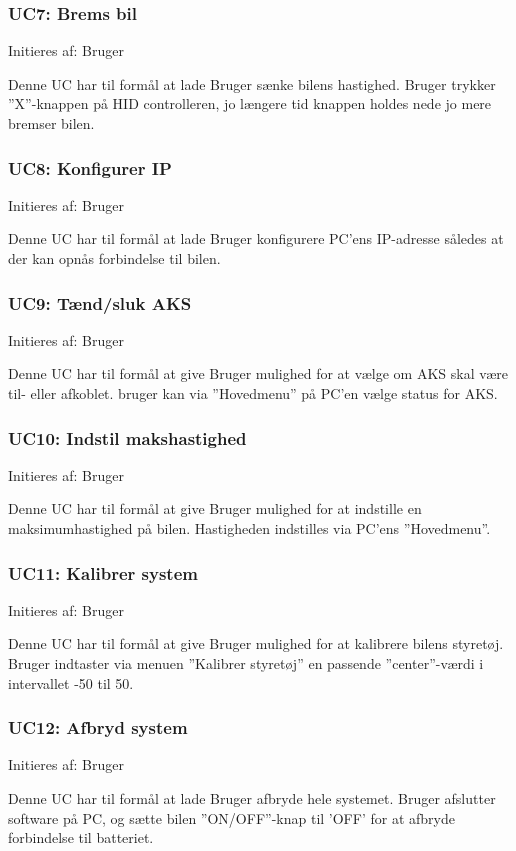\subsubsection{UC7: Brems bil}
Initieres af: Bruger

Denne UC har til formål at lade Bruger sænke bilens hastighed. Bruger trykker ''X''-knappen på HID controlleren, jo længere tid knappen holdes nede jo mere bremser bilen. 

\subsubsection{UC8: Konfigurer IP}
Initieres af: Bruger

Denne UC har til formål at lade Bruger konfigurere PC'ens IP-adresse således at der kan opnås forbindelse til bilen.  

\subsubsection{UC9: Tænd/sluk AKS}
Initieres af: Bruger

Denne UC har til formål at give Bruger mulighed for at vælge om AKS skal være til- eller afkoblet. bruger kan via ''Hovedmenu'' på PC'en vælge status for AKS. 

\subsubsection{UC10: Indstil makshastighed}
Initieres af: Bruger

Denne UC har til formål at give Bruger mulighed for at indstille en maksimumhastighed på bilen. Hastigheden indstilles via PC'ens ''Hovedmenu''.

\subsubsection{UC11: Kalibrer system}
Initieres af: Bruger

Denne UC har til formål at give Bruger mulighed for at kalibrere bilens styretøj. Bruger indtaster via menuen ''Kalibrer styretøj'' en passende ''center''-værdi i intervallet -50 til 50.  

\subsubsection{UC12: Afbryd system}
Initieres af: Bruger

Denne UC har til formål at lade Bruger afbryde hele systemet. Bruger afslutter software på PC, og sætte bilen ''ON/OFF''-knap til 'OFF' for at afbryde forbindelse til batteriet. 
\clearpage

